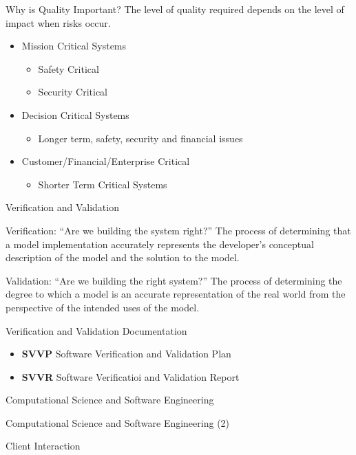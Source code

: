 \documentclass[aspectratio=1610,xcolor=dvipsnames,t,compress]{beamer}
\begin{document}
\begin{frame}{Why is Quality Important?}
    The level of quality required depends on the level of impact when risks
    occur.
    \begin{itemize}
        \item Mission Critical Systems
        \begin{itemize}
            \item Safety Critical
            \item Security Critical
        \end{itemize}
        \item Decision Critical Systems 
        \begin{itemize} 
            \item Longer term, safety, security and financial issues
        \end{itemize}
        \item Customer/Financial/Enterprise Critical
        \begin{itemize}
            \item Shorter Term Critical Systems
        \end{itemize} 
    \end{itemize}
\end{frame}

\begin{frame}{Verification and Validation}
    \begin{block}{Verification: “Are we building the system right?”}
        The process of determining that a model implementation accurately 
        represents the developer's conceptual description of the 
        model and the solution to the model. 
    \end{block}

    \begin{block}{Validation: “Are we building the right system?”}
        The process of determining the degree to which a model is an 
        accurate representation of the real world from the 
        perspective of the intended uses of the model. 
    \end{block}

    \begin{block}{Verification and Validation Documentation}
        \begin{itemize}
            \item \textbf{SVVP} Software Verification and Validation Plan
            \item \textbf{SVVR} Software Verificatioi and Validation Report
        \end{itemize}
    \end{block}

\end{frame}

\begin{frame}{Computational Science and Software Engineering}
\end{frame} 

\begin{frame}{Computational Science and Software Engineering (2)}
\end{frame}

\begin{frame}{Client Interaction}
\end{frame} 
    
\end{document}
